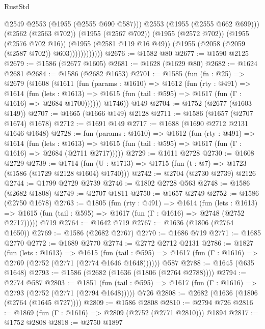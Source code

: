 \begin{lexlean}{RustStd}
\begin{coremodule}
                            @2549
                            @2553
                            (@1955 (@2555 @690 @587)))
                          @2553
                          (@1955 (@2555 @662 @699)))
                        (@2562 (@2563 @702))
                        (@1955 (@2567 @702))
                        (@1955 (@2572 @702))
                        (@1955 (@2576 @702 @16))
                        (@1955 (@2581 @119 @16 @49))
                        (@1955 (@2058 (@2059 (@2587 @702)) @603))))))))))))
@2676 := @1582 @80
@2677 := @1590 @2125
@2679 := @1586 (@2677 @1605)
@2681 := @1628 (@1629 @80)
@2682 := @1624 @2681
@2684 := @1586 (@2682 @1653)
@2701 := @1585
    (fun (fn : @25) =>
    @2679
      (@1608
        (@1611
          (fun (params : @1610) =>
          @1612
            (fun (rty : @491) =>
            @1614
              (fun (lets : @1613) =>
              @1615 (fun (tail : @595) => @1617 (fun (Γ : @1616) => @2684 @1700))))))
        @1746))
    @149
@2704 := @1752 (@2677 (@1603 @149))
@2707 := @1665 (@1666 @149) @2128
@2711 := @1586 (@1657 (@2707 @1674) @1678)
@2712 := @1691 @149
@2717 := @1688 (@1690 @2712 @2131 @1646 @1648)
@2728 := fun (params : @1610) =>
  @1612
    (fun (rty : @491) =>
    @1614
      (fun (lets : @1613) =>
      @1615 (fun (tail : @595) => @1617 (fun (Γ : @1616) => @2684 (@2711 @2717)))))
@2729 := @1611 @2728
@2730 := @1608 @2729
@2739 := @1714 (fun (U : @1713) => @1715 (fun (t : @7) => @1723 (@1586 (@1729 @2128 @1604) @1740)))
@2742 := @2704 (@2730 @2739) @2126
@2744 := @1799 @2729 @2739
@2746 := @1802 @2728 @563
@2748 := @1586 (@2682 @1808)
@2749 := @2707 @1811
@2750 := @1657 @2749
@2752 := @1586 (@2750 @1678)
@2763 := @1805
    (fun (rty : @491) =>
    @1614
      (fun (lets : @1613) =>
      @1615 (fun (tail : @595) => @1617 (fun (Γ : @1616) => @2748 (@2752 @2717)))))
    @719
@2764 := @1642 @719
@2767 := @1636 (@1806 (@2764 @1650))
@2769 := @1586 (@2682 @2767)
@2770 := @1686 @719
@2771 := @1685 @2770
@2772 := @1689 @2770
@2774 := @2772 @2712 @2131
@2786 := @1827
    (fun (lets : @1613) =>
    @1615
      (fun (tail : @595) => @1617 (fun (Γ : @1616) => @2769 (@2752 (@2771 (@2774 @1646 @1648))))))
    @587
@2788 := @1645 (@635 @1648)
@2793 := @1586 (@2682 (@1636 (@1806 (@2764 @2788))))
@2794 := @2774 @587
@2803 := @1851
    (fun (tail : @595) => @1617 (fun (Γ : @1616) => @2793 (@2752 (@2771 (@2794 @1648)))))
    @726
@2808 := @2682 (@1636 (@1806 (@2764 (@1645 @727))))
@2809 := @1586 @2808
@2810 := @2794 @726
@2816 := @1869 (fun (Γ : @1616) => @2809 (@2752 (@2771 @2810))) @1894
@2817 := @1752 @2808
@2818 := @2750 @1897

\end{coremodule}
\end{lexlean}
